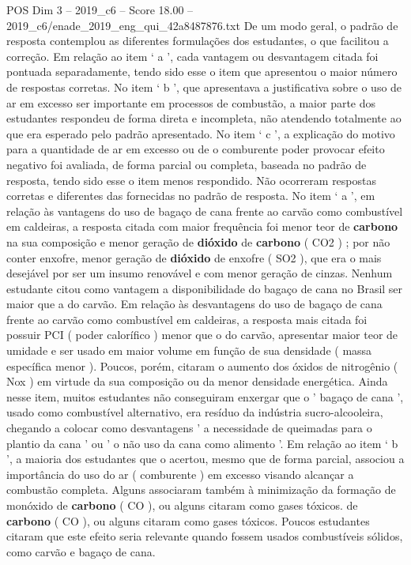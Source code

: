\begin{textsample}{POS Dim 3 – 2019\_c6 – Score 18.00 – 2019\_c6/enade\_2019\_eng\_qui\_42a8487876.txt}
De um modo geral, o padrão de resposta contemplou as diferentes formulações dos estudantes, o que facilitou a correção.
Em relação ao item ‘ a ’, cada vantagem ou desvantagem citada foi pontuada separadamente, tendo sido esse o item que apresentou o maior número de respostas corretas.
No item ‘ b ’, que apresentava a justificativa sobre o uso de ar em excesso ser importante em processos de combustão, a maior parte dos estudantes respondeu de forma direta e incompleta, não atendendo totalmente ao que era esperado pelo padrão apresentado.
No item ‘ c ’, a explicação do motivo para a quantidade de ar em excesso ou de o comburente poder provocar efeito negativo foi avaliada, de forma parcial ou completa, baseada no padrão de resposta, tendo sido esse o item menos respondido.
Não ocorreram respostas corretas e diferentes das fornecidas no padrão de resposta.
No item ‘ a ’, em relação às vantagens do uso de bagaço de cana frente ao carvão como combustível em caldeiras, a resposta citada com maior frequência foi menor teor de \textbf{carbono} na sua composição e menor geração de \textbf{dióxido} de \textbf{carbono} ( CO2 ) ; por não conter enxofre, menor geração de \textbf{dióxido} de enxofre ( SO2 ), que era o mais desejável por ser um insumo renovável e com menor geração de cinzas.
Nenhum estudante citou como vantagem a disponibilidade do bagaço de cana no Brasil ser maior que a do carvão.
Em relação às desvantagens do uso de bagaço de cana frente ao carvão como combustível em caldeiras, a resposta mais citada foi possuir PCI ( poder calorífico ) menor que o do carvão, apresentar maior teor de umidade e ser usado em maior volume em função de sua densidade ( massa específica menor ).
Poucos, porém, citaram o aumento dos óxidos de nitrogênio ( Nox ) em virtude da sua composição ou da menor densidade energética.
Ainda nesse item, muitos estudantes não conseguiram enxergar que o ' bagaço de cana ', usado como combustível alternativo, era resíduo da indústria sucro-alcooleira, chegando a colocar como desvantagens ' a necessidade de queimadas para o plantio da cana ' ou ' o não uso da cana como alimento '.
Em relação ao item ‘ b ’, a maioria dos estudantes que o acertou, mesmo que de forma parcial, associou a importância do uso do ar ( comburente ) em excesso visando alcançar a combustão completa.
Alguns associaram também à minimização da formação de monóxido de \textbf{carbono} ( CO ), ou alguns citaram como gases tóxicos. de \textbf{carbono} ( CO ), ou alguns citaram como gases tóxicos.
Poucos estudantes citaram que este efeito seria relevante quando fossem usados combustíveis sólidos, como carvão e bagaço de cana.

\end{textsample}

